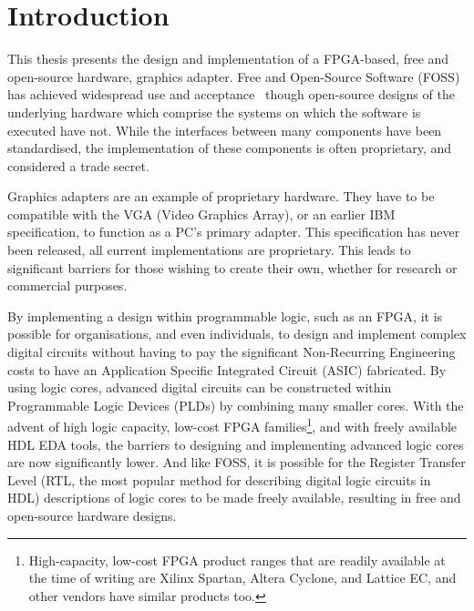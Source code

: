 \chapter{Introduction}
This thesis presents the design and implementation of a
FPGA-based,
free and open-source hardware, graphics adapter. Free and Open-Source Software
(FOSS) has
achieved widespread use and acceptance~\cite{lerner2002sse} though open-source
designs of the underlying hardware which comprise the systems on which the
software is executed have not. While the interfaces between many components have
been standardised, the implementation of these components is often proprietary,
and considered a trade secret.

Graphics adapters are an example of proprietary hardware. They have to be
compatible with the VGA
(Video Graphics Array), or an earlier IBM specification, to function as a
PC's primary adapter. This
specification has never been released, all current implementations are
proprietary. This leads to significant barriers for those wishing to create their
own, whether for research or commercial purposes.

By implementing a design within programmable logic, such as an FPGA, it is
possible for organisations, and even individuals, to design and implement complex
digital circuits without having to pay the significant Non-Recurring
Engineering costs
to have an Application Specific Integrated Circuit (ASIC) fabricated. By
using logic cores, advanced digital circuits can be constructed within
Programmable Logic Devices (PLDs) by combining many smaller cores. With the advent of high logic
capacity, low-cost FPGA families\footnote{High-capacity, low-cost FPGA product
ranges that are readily available at the time of writing are Xilinx Spartan,
Altera Cyclone, and Lattice EC, and other vendors have similar products too.},
and with freely available HDL EDA tools, the barriers to designing and
implementing advanced logic cores are now significantly lower. And like FOSS, it
is possible for the Register Transfer Level (RTL, the most popular method for
describing digital logic circuits in HDL) descriptions of logic cores to be made
freely available, resulting in free and open-source hardware designs.


